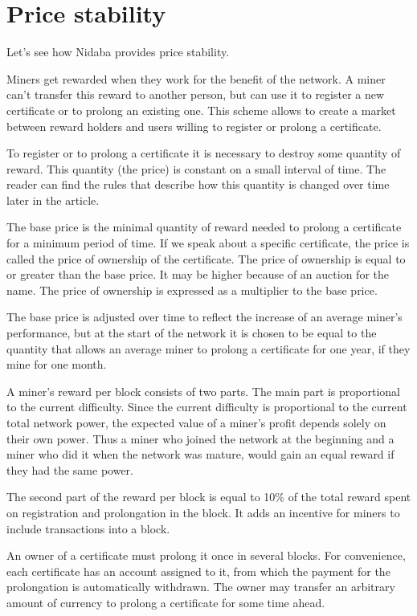 \documentclass[12pt]{article}
\begin{document}
\section{Price stability}

Let's see how Nidaba provides price stability.

Miners get rewarded when they work for the benefit of the network. A miner can't transfer this reward to another person, but can use it to register a new certificate or to prolong an existing one. This scheme allows to create a market between reward holders and users willing to register or prolong a certificate.

To register or to prolong a certificate it is necessary to destroy some quantity of reward. This quantity (the price) is constant on a small interval of time. The reader can find the rules that describe how this quantity is changed over time later in the article.

The base price is the minimal quantity of reward needed to prolong a certificate for a minimum period of time. If we speak about a specific certificate, the price is called the price of ownership of the certificate. The price of ownership is equal to or greater than the base price. It may be higher because of an auction for the name. The price of ownership is expressed as a multiplier to the base price.

The base price is adjusted over time to reflect the increase of an average miner's performance, but at the start of the network it is chosen to be equal to the quantity that allows an average miner to prolong a certificate for one year, if they mine for one month.

A miner's reward per block consists of two parts. The main part is proportional to the current difficulty. Since the current difficulty is proportional to the current total network power, the expected value of a miner's profit depends solely on their own power. Thus a miner who joined the network at the beginning and a miner who did it when the network was mature, would gain an equal reward if they had the same power.

The second part of the reward per block is equal to 10\% of the total reward spent on registration and prolongation in the block. It adds an incentive for miners to include transactions into a block.

An owner of a certificate must prolong it once in several blocks. For convenience, each certificate has an account assigned to it, from which the payment for the prolongation is automatically withdrawn. The owner may transfer an arbitrary amount of currency to prolong a certificate for some time ahead.
\end{document}
